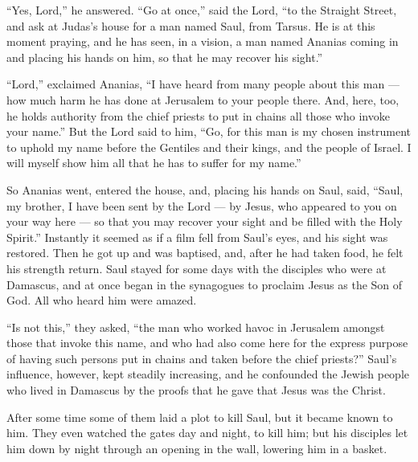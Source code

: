 ``Yes, Lord,'' he answered.  ``Go at once,'' said the Lord,
``to the Straight Street, and ask at Judas's house for a man named Saul,
from Tarsus. He is at this moment praying,  and he has
seen, in a vision, a man named Ananias coming in and placing his hands
on him, so that he may recover his sight.''

 ``Lord,'' exclaimed Ananias, ``I have heard from many
people about this man --- how much harm he has done at Jerusalem to your
people there.  And, here, too, he holds authority from the
chief priests to put in chains all those who invoke your name.''
 But the Lord said to him, ``Go, for this man is my chosen
instrument to uphold my name before the Gentiles and their kings, and
the people of Israel.  I will myself show him all that he
has to suffer for my name.''

 So Ananias went, entered the house, and, placing his hands
on Saul, said, ``Saul, my brother, I have been sent by the Lord --- by
Jesus, who appeared to you on your way here --- so that you may recover
your sight and be filled with the Holy Spirit.''  Instantly
it seemed as if a film fell from Saul's eyes, and his sight was
restored. Then he got up and was baptised,  and, after he
had taken food, he felt his strength return. Saul stayed for some days
with the disciples who were at Damascus,  and at once began
in the synagogues to proclaim Jesus as the Son of God.  All
who heard him were amazed.

``Is not this,'' they asked, ``the man who worked havoc in Jerusalem
amongst those that invoke this name, and who had also come here for the
express purpose of having such persons put in chains and taken before
the chief priests?''  Saul's influence, however, kept
steadily increasing, and he confounded the Jewish people who lived in
Damascus by the proofs that he gave that Jesus was the Christ.

 After some time some of them laid a plot to kill Saul,
 but it became known to him. They even watched the gates
day and night, to kill him;  but his disciples let him down
by night through an opening in the wall, lowering him in a basket.

